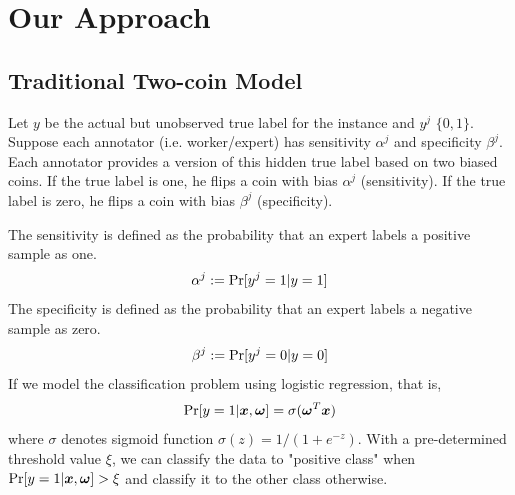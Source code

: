 \documentclass{article}
\begin{document}
\section{Our Approach}
\subsection{Traditional Two-coin Model}
Let $y$ be the actual but unobserved true label for the instance and $y^{j}$ \in $\lbrace 0,1 \rbrace$. Suppose each annotator (i.e. worker/expert) has sensitivity $\alpha^{j}$ and specificity $\beta^{j}$. Each annotator provides a version of this hidden true label based on two biased coins. If the true label is one, he flips a coin with bias $\alpha^j$ (sensitivity). If the true label is zero, he flips a coin with bias $\beta^j$ (specificity). 

The sensitivity is defined as the probability that an expert labels a positive sample as one.$$\alpha^{j}:=\textup{Pr}[y^{j}=1|y=1]$$
The specificity is defined as the probability that an expert labels a negative sample as zero. $$\beta^{j}:=\textup{Pr}[y^{j}=0|y=0]$$
If we model the classification problem using logistic regression, that is,
$$\textup{Pr}[y=1|\bm{x},\bm{\omega}]=\sigma(\bm{\omega}^{T}\bm{x})$$
where $\sigma$ denotes sigmoid function $\sigma ( z ) = 1 / \left( 1 + e ^ { - z } \right)$. With a pre-determined threshold value $\xi$, we can classify the data to "positive class" when $\textup{Pr}[y=1|\bm{x},\bm{\omega}]>\xi$ and classify it to the other class otherwise.
\end{document}

